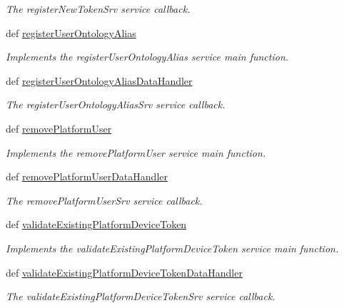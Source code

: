 \begin{DoxyCompactItemize}
\begin{DoxyCompactList}\small\item\em The register\-New\-Token\-Srv service callback. \end{DoxyCompactList}\item 
def \hyperlink{classmysql__wrapper_1_1MySQLdbWrapper_abd8179b73ace8c795deea68676aef84b}{register\-User\-Ontology\-Alias}
\begin{DoxyCompactList}\small\item\em Implements the register\-User\-Ontology\-Alias service main function. \end{DoxyCompactList}\item 
def \hyperlink{classmysql__wrapper_1_1MySQLdbWrapper_a6ffb093f9624e46c02682ce3118e9240}{register\-User\-Ontology\-Alias\-Data\-Handler}
\begin{DoxyCompactList}\small\item\em The register\-User\-Ontology\-Alias\-Srv service callback. \end{DoxyCompactList}\item 
def \hyperlink{classmysql__wrapper_1_1MySQLdbWrapper_acf86487d614c1dd67df70ca1dc29d28c}{remove\-Platform\-User}
\begin{DoxyCompactList}\small\item\em Implements the remove\-Platform\-User service main function. \end{DoxyCompactList}\item 
def \hyperlink{classmysql__wrapper_1_1MySQLdbWrapper_ad1b5a47c12ab21e8566b380f56a70a67}{remove\-Platform\-User\-Data\-Handler}
\begin{DoxyCompactList}\small\item\em The remove\-Platform\-User\-Srv service callback. \end{DoxyCompactList}\item 
def \hyperlink{classmysql__wrapper_1_1MySQLdbWrapper_a40d33b8bbaf14f545ca26fb751e383e8}{validate\-Existing\-Platform\-Device\-Token}
\begin{DoxyCompactList}\small\item\em Implements the validate\-Existing\-Platform\-Device\-Token service main function. \end{DoxyCompactList}\item 
def \hyperlink{classmysql__wrapper_1_1MySQLdbWrapper_ad8652e3b7f18f5b73062c9c4d992a417}{validate\-Existing\-Platform\-Device\-Token\-Data\-Handler}
\begin{DoxyCompactList}\small\item\em The validate\-Existing\-Platform\-Device\-Token\-Srv service callback. \end{DoxyCompactList}\item 

\end{DoxyCompactItemize}
